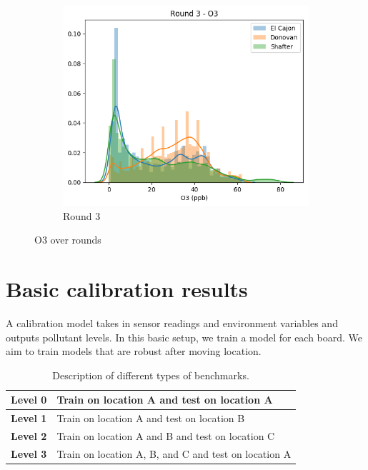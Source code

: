 \documentclass[journal abbreviation, manuscript]{copernicus}
\begin{document}
\begin{figure}[H]
\begin{subfigure}{0.32\textwidth}
\includegraphics[width=\textwidth]{results/distributions/round3_o3.png}
\caption{Round 3}
\end{subfigure}
\caption{O3 over rounds}
\label{fig:o3-rounds}
\end{figure}


\section{Basic calibration results}

A calibration model takes in sensor readings and environment
variables and outputs pollutant levels. In this basic setup,
we train a model for each board.
We aim to train models that are robust after moving location.

\begin{table}[H]
\centering
\begin{tabular}{|l|l|}
\hline
\textbf{Level 0} & Train on location A and test on location A \\ \hline
\textbf{Level 1} & Train on location A and test on location B \\ \hline
\textbf{Level 2} & Train on location A and B and test on location C \\ \hline
\textbf{Level 3} & Train on location A, B, and C and test on location A \\ \hline
\end{tabular}
\caption{Description of different types of benchmarks.}
\label{tab:levels}
\end{table}
\end{document}
